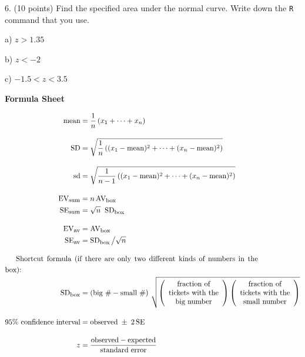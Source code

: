 \documentclass[10pt]{article}
\begin{document}
\vfill
\eject

6. (10 points) Find the specified area under the normal curve.  Write down the \texttt{R} command that you use.

\hspace{10pt} a) $z>1.35$ 
\bigskip
\bigskip\bigskip\bigskip

\hspace{10pt} b) $z<-2$
\bigskip
\bigskip\bigskip\bigskip

\hspace{10pt} c) $-1.5 < z < 3.5$
\vfill



\begin{center}
\textbf{\large Formula Sheet}
\end{center}\vspace{-15pt}
\begin{align*}
\mbox{mean} &=\frac{1}{n}\left(x_1 + \cdots + x_n\right)\\[10pt]
\mbox{SD}   &=\sqrt{\frac{1}{n}\left( (x_1 - \mbox{mean})^2 + \cdots + (x_n - \mbox{mean})^2\right)}\\[10pt]
\mbox{sd}   &=\sqrt{\frac{1}{n-1}\left( (x_1 - \mbox{mean})^2 + \cdots + (x_n - \mbox{mean})^2\right)}\\[10pt]
%
\mbox{EV}_{\mbox{\footnotesize sum}} & = n\,\mbox{AV}_{\mbox{\footnotesize box}}\\
\mbox{SE}_{\mbox{\footnotesize sum}} & = \sqrt{n}\;\;\mbox{SD}_{\mbox{\footnotesize box}}\\[10pt]
%
\mbox{EV}_{\mbox{\footnotesize av}} & = \mbox{AV}_{\mbox{\footnotesize box}}\\
\mbox{SE}_{\mbox{\footnotesize av}} & = \mbox{SD}_{\mbox{\footnotesize box}}\,\big{/}\sqrt{n}\\[10pt]
%
%
\noalign{Shortcut formula (if there are only two different kinds of numbers in the box):}
\mbox{SD}_{\mbox{\footnotesize box}} &=
  \left(\mbox{big \#} - \mbox{small \#}\right)\,\sqrt{
  \left(\begin{array}{c}\mbox{fraction of}\\ \mbox{tickets with the}\\ \mbox{big number}\end{array}\right)
  \left(\begin{array}{c}\mbox{fraction of}\\\mbox{tickets with the}\\\mbox{small number}\end{array}\right)}\\[10pt]
%
\mbox{95\% confidence interval} &= \mbox{observed} \;\pm\; 2\,\mbox{SE}\\[10pt]
z &= \frac{\mbox{observed} - \mbox{expected}}{\mbox{standard error}}
\end{align*}
\end{document}
